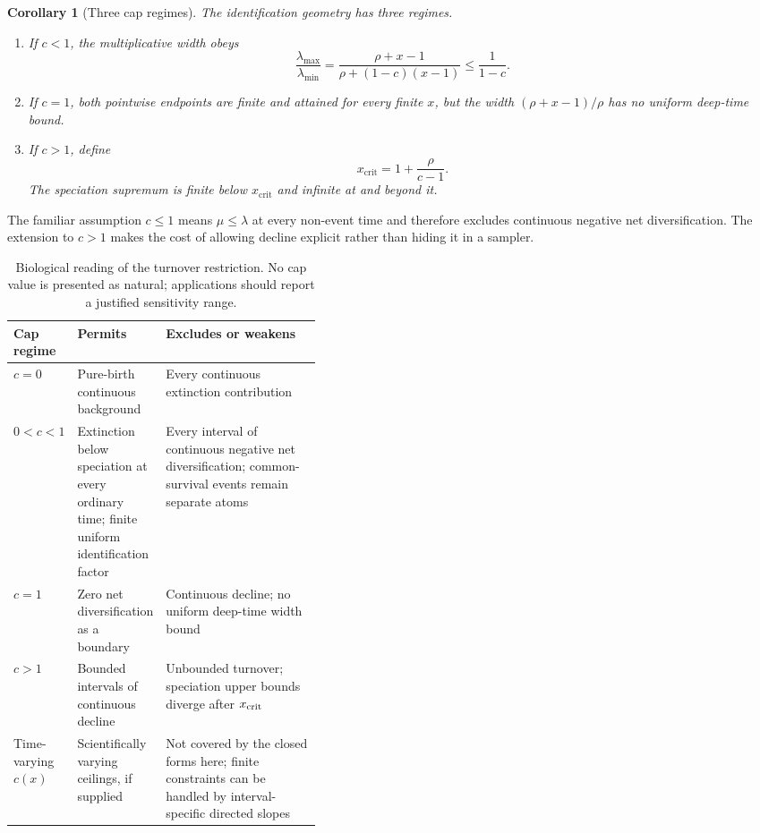 \documentclass[11pt]{article}
\newtheorem{corollary}[theorem]{Corollary}
\theoremstyle{definition}
\begin{document}
\begin{corollary}[Three cap regimes]\label{cor:regimes}
The identification geometry has three regimes.
\begin{enumerate}[label=(\roman*)]
\item If $c<1$, the multiplicative width obeys
\begin{equation}
 \frac{\lambda_{\max}}{\lambda_{\min}}
 =\frac{\rho+x-1}{\rho+(1-c)(x-1)}\leq\frac1{1-c}. \label{eq:globalfactor}
\end{equation}
\item If $c=1$, both pointwise endpoints are finite and attained for every finite $x$, but the width $(\rho+x-1)/\rho$ has no uniform deep-time bound.
\item If $c>1$, define
\begin{equation}
 x_{\mathrm{crit}}=1+\frac{\rho}{c-1}. \label{eq:xcrit}
\end{equation}
The speciation supremum is finite below $x_{\mathrm{crit}}$ and infinite at and beyond it.
\end{enumerate}
\end{corollary}

The familiar assumption $c\leq1$ means $\mu\leq\lambda$ at every non-event time and therefore excludes continuous negative net diversification. The extension to $c>1$ makes the cost of allowing decline explicit rather than hiding it in a sampler.

\begin{table}[H]
\centering
\small
\renewcommand{\arraystretch}{1.08}
\begin{tabularx}{\linewidth}{@{}p{0.13\linewidth}p{0.27\linewidth}X@{}}
\toprule
Cap regime & Permits & Excludes or weakens \\
\midrule
$c=0$ & Pure-birth continuous background & Every continuous extinction contribution \\
$0<c<1$ & Extinction below speciation at every ordinary time; finite uniform identification factor & Every interval of continuous negative net diversification; common-survival events remain separate atoms \\
$c=1$ & Zero net diversification as a boundary & Continuous decline; no uniform deep-time width bound \\
$c>1$ & Bounded intervals of continuous decline & Unbounded turnover; speciation upper bounds diverge after $x_{\rm crit}$ \\
Time-varying $c(x)$ & Scientifically varying ceilings, if supplied & Not covered by the closed forms here; finite constraints can be handled by interval-specific directed slopes \\
\bottomrule
\end{tabularx}
\caption{Biological reading of the turnover restriction. No cap value is presented as natural; applications should report a justified sensitivity range.}
\label{tab:capbiology}
\end{table}
\end{document}
